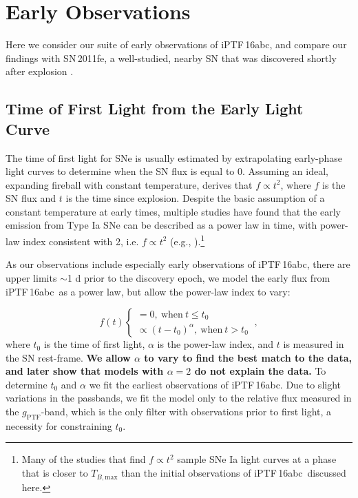 \documentclass[twocolumn]{aastex61}
\newcommand{\abc}{iPTF\,16abc}
\begin{document}
\section{Early Observations}
\label{sec:first_light}

Here we consider our suite of early observations of \abc, and compare our
findings with SN\,2011fe, a well-studied, nearby SN that was discovered
shortly after explosion
\citep{2011Natur.480..344N,2012ApJ...744L..17B,2014ApJ...784...85P}.

\subsection{Time of First Light from the Early Light Curve}
\label{sec:lc_fit}

The time of first light for SNe is usually estimated by extrapolating
early-phase light curves to determine when the SN flux is equal to 0.
Assuming an ideal, expanding fireball with constant temperature,
\citet{1982ApJ...253..785A} derives that $f \propto t^2$, where $f$ is the SN
flux and $t$ is the time since explosion. Despite the basic assumption of a
constant temperature at early times, multiple studies have found that the
early emission from Type Ia SNe can be described as a power law in time, with
power-law index consistent with 2, i.e. $f \propto t^2$ (e.g.,
\citealt{2006AJ....132.1707C, 2010ApJ...712..350H,
2011MNRAS.416.2607G}).\footnote{Many of the studies that find $f \propto t^2$
sample SNe Ia light curves at a phase that is closer to $T_{B,\mathrm{max}}$
than the initial observations of \abc\ discussed here.}

As our observations include especially early observations of \abc, there are
upper limits $\sim$1 d prior to the discovery epoch, we model the early flux
from \abc\ as a power law, but allow the power-law index to vary:

\begin{equation}
  \label{eq:broken_power_law}
  f(t) \left\{
    \begin{array}{ll}
      = 0,\ \textrm{when}\ t \le t_0 \\
      \propto (t-t_0)^{\alpha},\ \textrm{when}\ t>t_0
    \end{array}
  \right.\ ,
\end{equation}
where $t_0$ is the time of first light, $\alpha$ is the power-law index, and
$t$ is measured in the SN rest-frame. \textbf{We allow $\alpha$ to vary to
find the best match to the data, and later show that models with $\alpha = 2$
do not explain the data.} To determine $t_0$ and $\alpha$ we fit the earliest
observations of \abc. Due to slight variations in the passbands, we fit the
model only to the relative flux measured in the $g_\mathrm{PTF}$-band, which
is the only filter with observations prior to first light, a necessity for
constraining $t_0$.
\end{document}
